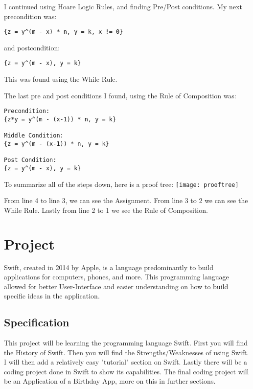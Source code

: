 \documentclass{article}
\theoremstyle{theorem}
\theoremstyle{definition}
\theoremstyle{remark}
\begin{document}
\noindent\newline\newline I continued using Hoare Logic Rules, and finding Pre/Post conditions. My next precondition was:

\begin{verbatim}
{z = y^(m - x) * n, y = k, x != 0}
\end{verbatim}

\noindent\newline and postcondition:

\begin{verbatim}
{z = y^(m - x), y = k}
\end{verbatim}

\noindent\newline This was found using the While Rule.

\noindent\newline\newline The last pre and post conditions I found, using the Rule of Composition was:

\begin{verbatim}
Precondition:
{z*y = y^(m - (x-1)) * n, y = k}

Middle Condition:
{z = y^(m - (x-1)) * n, y = k}

Post Condition:
{z = y^(m - x), y = k}
\end{verbatim}


\noindent\newline To summarize all of the steps down, here is a proof tree:
\noindent\newline\texttt{[image: prooftree]}

\noindent\newline From line 4 to line 3, we can see the Assignment. From line 3 to 2 we can see the While Rule. Lastly from line 2 to 1 we see the Rule of Composition.

\section{Project}

Swift, created in 2014 by Apple, is a language predominantly to build applications for computers, phones, and more. This programming language allowed for better User-Interface and easier understanding on how to build specific ideas in the application. 
\subsection{Specification}
This project will be learning the programming language Swift. First you will find the History of Swift. Then you will find the Strengths/Weaknesses of using Swift. I will then add a relatively easy "tutorial" section on Swift. Lastly there will be a coding project done in Swift to show its capabilities. The final coding project will be an Application of a Birthday App, more on this in further sections.
\end{document}
